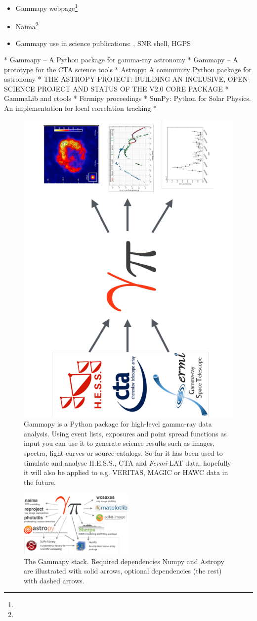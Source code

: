\begin{itemize}
\item Gammapy webpage\footnote{\GammapyUrl}
\item Naima\footnote{\NaimaUrl} \citep{Naima}
\item Gammapy use in science publications: \citep{Owen2015}, SNR shell, HGPS
\end{itemize}

* Gammapy – A Python package for gamma-ray astronomy
* Gammapy – A prototype for the CTA science tools 
* Astropy: A community Python package for astronomy
* THE ASTROPY PROJECT: BUILDING AN INCLUSIVE, OPEN-SCIENCE PROJECT AND STATUS OF THE V2.0 CORE PACKAGE
* GammaLib and ctools
* Fermipy proceedings
* SunPy: Python for Solar Physics. An implementation for local correlation tracking
*

\begin{figure}[t]
\centering
\includegraphics[height=0.5\textwidth, angle=270]{figures/gammapy-big-picture}
\caption{
Gammapy is a Python package for high-level gamma-ray data analysis. Using event
lists, exposures and point spread functions as input you can use it to generate
science results such as images, spectra, light curves or source catalogs. So far
it has been used to simulate and analyse H.E.S.S., CTA and \textit{Fermi}-LAT
data, hopefully it will also be applied to e.g. VERITAS, MAGIC or HAWC data in
the future.
}
\label{fig:big-picture}
\end{figure}

\begin{figure}[t]
\centering
\includegraphics[width=0.5\textwidth]{figures/gammapy-dependencies}
\caption{
The Gammapy stack. Required dependencies Numpy and Astropy are illustrated with
solid arrows, optional dependencies (the rest) with dashed arrows.
}
\label{fig:dependencies}
\end{figure}
